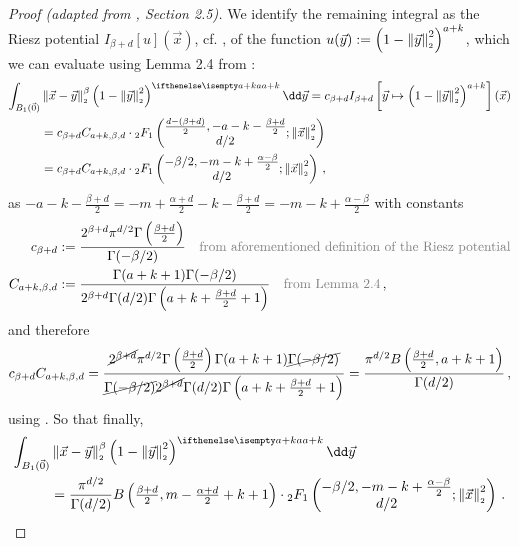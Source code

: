 \begin{proof}[Proof (adapted from \cite{2021-arbitrary-dimensions}, Section 2.5)]
  We identify the remaining integral as the Riesz potential $I_{\beta+d}[u](\vec{x})$, cf. , of the function $u(\vec{y}) := \left(1-\left\lVert\vec{y}\right\rVert_{\scriptscriptstyle 2}^2\right)^{a+k}$, which we can evaluate using Lemma 2.4 from \cite{2011-porous-medium-1}:
  \begin{align*}
    \int_{B_1(\vec{0})} & \norm{\vec{x}-\vec{y}}^\beta \weight[a+k]{y} \dd\vec{y} = c_{\beta+d} I_{\beta+d}\left[\vec{y} \mapsto \left(1-\norm{\vec{y}}^2\right)^{a+k}\right](\vec{x}) \\
                        & = c_{\beta+d} C_{a+k, \beta, d} \cdot {}_2F_1\left(\begin{matrix}\frac{d-(\beta+d)}{2}, -a-k-\frac{\beta+d}{2} \\d/2\end{matrix}; \norm{\vec{x}}^2\right)    \\
                        & = c_{\beta+d} C_{a+k, \beta, d} \cdot {}_2F_1\left(\begin{matrix}-\beta/2, -m-k+\frac{\alpha-\beta}{2} \\d/2\end{matrix}; \norm{\vec{x}}^2\right)\,,
  \end{align*}
  as $-a-k-\frac{\beta+d}{2} = -m + \frac{\alpha+d}{2} -k - \frac{\beta+d}{2} = -m-k+\frac{\alpha-\beta}{2}$ with constants
  \begin{align*}
    c_{\beta+d}       & := \frac{2^{\beta+d} \pi^{d/2} \Gamma\left(\frac{\beta+d}{2}\right)}{\Gamma(-\beta/2)}                      \quad \text{\textcolor{gray}{from aforementioned definition of the Riesz potential}} \\
    C_{a+k, \beta, d} & := \frac{\Gamma(a+k+1) \Gamma(-\beta/2)}{2^{\beta+d}\Gamma(d/2) \Gamma\left(a+k+\frac{\beta+d}{2}+1\right)} \quad \text{\textcolor{gray}{from Lemma 2.4}}\,,
  \end{align*}
  and therefore
  $$c_{\beta+d} C_{a+k, \beta, d} = \frac{\cancel{2^{\beta+d}} \pi^{d/2} \Gamma\left(\frac{\beta+d}{2}\right) \Gamma(a+k+1) \cancel{\Gamma(-\beta/2)}}{\cancel{\Gamma(-\beta/2)} \cancel{2^{\beta+d}}\Gamma(d/2) \Gamma\left(a+k+\frac{\beta+d}{2}+1\right)} = \frac{\pi^{d/2}B\left(\tfrac{\beta+d}{2}, a+k+1\right)}{\Gamma(d/2)}\,,$$
  using .
  So that finally,
  \begin{align*}
    \int_{B_1(\vec{0})} & \norm{\vec{x}-\vec{y}}^\beta \weight[a+k]{y} \dd\vec{y}                                                                                                                                                         \\
                        & =\frac{\pi^{d/2}}{\Gamma(d/2)} B\left(\tfrac{\beta+d}{2}, m-\tfrac{\alpha+d}{2}+k+1\right) \cdot {}_2F_1\left(\begin{matrix}-\beta/2, -m-k+\frac{\alpha-\beta}{2} \\d/2\end{matrix}; \norm{\vec{x}}^2\right)\,.
  \end{align*}


\end{proof}
